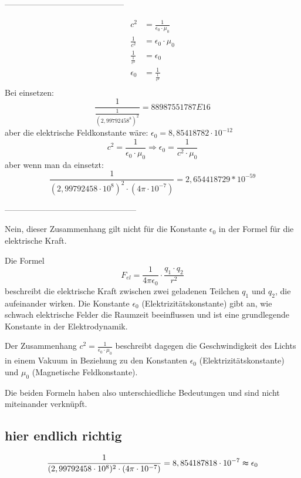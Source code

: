\documentclass{report}
\begin{document}
--------------------------------------------

\begin{align}
c^2 &= \frac{1}{\epsilon_0 \cdot \mu_0} \\ %
\frac{1}{c^2} &= \epsilon_0 \cdot \mu_0 \\ %
\frac{1}{\frac{1}{c^2}} &= \epsilon_0 \\ %
\epsilon_0 &= \frac{1}{\frac{1}{c^2}} \\ %
\end{align}
Bei einsetzen:
\begin{equation*}
  \frac{1}{\frac{1}{(2,99792458^8)^2}} = 88987551787 E16
\end{equation*}
aber die elektrische Feldkonstante wäre: $\epsilon_0 = 8,85418782\cdot 10^{-12}$
\[c^2 = \frac{1}{\epsilon_0\cdot\mu_0}
\Rightarrow \epsilon_0 = \frac{1}{c^2\cdot\mu_0}
\]
aber wenn man da einsetzt:
\[\frac{1}{(2,99792458\cdot 10^8)^2\cdot (4\pi\cdot 10^{-7})}= 2,654418729*10^{-59}\]

------------------------------------------------

Nein, dieser Zusammenhang gilt nicht für die Konstante $\epsilon_0$ in der Formel
für die elektrische Kraft.

Die Formel 
\begin{equation}
  F_{el}=\frac{1}{4π\epsilon_0}\cdot\frac{q_1\cdot q_2}{r^2}
\end{equation}beschreibt die elektrische Kraft zwischen zwei geladenen Teilchen $q_1$ und $q_2$,
die aufeinander wirken. Die Konstante $\epsilon_0$ (Elektrizitätskonstante) gibt
an, wie schwach elektrische Felder die Raumzeit beeinflussen und ist eine
grundlegende Konstante in der Elektrodynamik.

Der Zusammenhang $c^2=\frac{1}{\epsilon_0\cdot\mu_0}$ beschreibt dagegen die
Geschwindigkeit des Lichts in einem Vakuum in Beziehung zu den Konstanten
$\epsilon_0$ (Elektrizitätskonstante) und $\mu_0$ (Magnetische Feldkonstante).

Die beiden Formeln haben also unterschiedliche Bedeutungen und sind nicht
miteinander verknüpft.
\subsection{hier endlich richtig}
\begin{equation*}
  \frac{1}{(2,99792458\cdot10^8)^2\cdot(4\pi\cdot 10^{-7})} = 8,854187818\cdot 10^{-7} \thickapprox \epsilon_0
\end{equation*}
\clearpage
\end{document}
